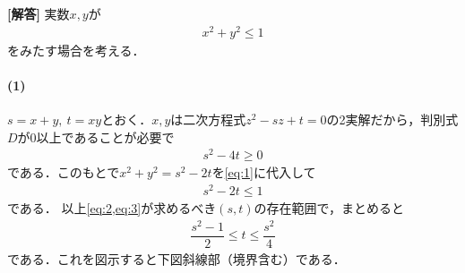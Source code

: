 \documentclass[../../main.tex]{subfiles}
\begin{document}
\begin{oframed}
  
\end{oframed}

{\bf [解答]}
実数$x,y$が
\begin{align}
  x^2+y^2\le1 \label{eq:1}
\end{align}
をみたす場合を考える．

\paragraph{(1)}

$s=x+y,\ t=xy$とおく．$x,y$は二次方程式$z^2-sz+t=0$の2実解だから，判別式$D$が$0$以上であることが必要で
\begin{align}
  s^2-4t\ge0 \label{eq:2}
\end{align}
である．このもとで$x^2+y^2=s^2-2t$を\cref{eq:1}に代入して
\begin{align}
  s^2-2t\le1 \label{eq:3}
\end{align}
である．
以上\cref{eq:2,eq:3}が求めるべき$(s,t)$の存在範囲で，まとめると
\begin{align}
  \dfrac{s^2-1}{2}\le t\le\dfrac{s^2}{4} \label{eq:4}
\end{align}
である．これを図示すると下図斜線部（境界含む）である．
\end{document}
